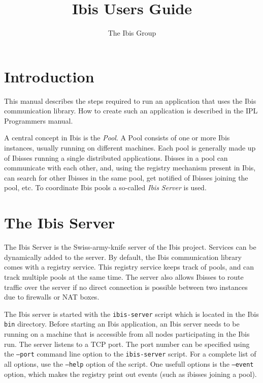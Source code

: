 \documentclass[10pt]{article}
\begin{document}
\title{Ibis Users Guide}

\author{The Ibis Group}

\maketitle

\section{Introduction}

This manual describes the steps required to run an application that uses
 the Ibis communication library. How to create such an application
is described in the IPL Programmers manual.

A central concept in Ibis is the \emph{Pool}. A Pool consists of one or
more Ibis instances, usually running on different machines. Each pool is
generally made up of Ibisses running a single distributed applications.
Ibisses in a pool can communicate with each other, and, using the
registry mechanism present in Ibis, can search for other Ibisses in the
same pool, get notified of Ibisses joining the pool, etc. To
coordinate Ibis pools a so-called \emph{Ibis Server} is used.

\section{The Ibis Server}

The Ibis Server is the Swiss-army-knife server of the Ibis project.
Services can be dynamically added to the server. By default, the Ibis
communication library comes with a registry service. This registry
service keeps track of pools, and can track multiple pools at the same
time.  The server also allows Ibisses to route traffic over the server
if no direct connection is possible between two instances due to
firewalls or NAT boxes.

The Ibis server is started with the \texttt{ibis-server} script which is
located in the Ibis \texttt{bin} directory.  Before starting an Ibis
application, an Ibis server needs to be running on a machine that is
accessible from all nodes participating in the Ibis run. The server
listens to a TCP port. The port number can be specified using the
\texttt{--port} command line option to the \texttt{ibis-server} script.
For a complete list of all options, use the \texttt{--help} option of
the script. One usefull options is the  \texttt{--event} option, which
makes the registry print out events (such as ibisses joining a pool).
\end{document}
